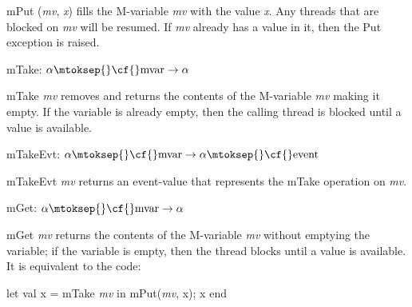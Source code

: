 \begin{descr}
\begin{speccomment}
\item {\cf \small m\-Put (\mbox{\cf \small \textit{mv}}, \mbox{\cf \small \textit{x}})           } 
fills the M-variable \mbox{\cf \small \textit{mv}} with the value \mbox{\cf \small \textit{x}}. 	  Any threads that are blocked on \mbox{\cf \small \textit{mv}} will be resumed. 	  If \mbox{\cf \small \textit{mv}} already has a value in it, then the {\cf \small Put} 	  exception is raised.     \end{speccomment}
\item {}{} {\cf mTake: \(\alpha\mtoksep{}\mbox{\cf{}mvar}\rightarrow \alpha\)}\label{val-SYNC_VAR.mTake}


\begin{speccomment}
\item {\cf \small m\-Take \mbox{\cf \small \textit{mv}}         } 
removes and returns the contents of the M-variable \mbox{\cf \small \textit{mv}} 	making it empty. 	If the variable is already empty, then the calling thread 	is blocked until a value is available.     \end{speccomment}
\item {}{} {\cf mTakeEvt: \(\alpha\mtoksep{}\mbox{\cf{}mvar}\rightarrow \alpha\mtoksep{}\mbox{\cf{}event}\)}\label{val-SYNC_VAR.mTakeEvt}


\begin{speccomment}
\item {\cf \small m\-Take\-Evt \mbox{\cf \small \textit{mv}}           } 
returns an event-value that represents the {\cf \small m\-Take} 	  operation on \mbox{\cf \small \textit{mv}}.     \end{speccomment}
\item {}{} {\cf mGet: \(\alpha\mtoksep{}\mbox{\cf{}mvar}\rightarrow \alpha\)}\label{val-SYNC_VAR.mGet}


\begin{speccomment}
\item {\cf \small m\-Get \mbox{\cf \small \textit{mv}}           } 
returns the contents of the M-variable \mbox{\cf \small \textit{mv}} without emptying 	  the variable; if the variable is empty, then the thread blocks until 	  a value is available. 	  It is equivalent to the code: 	  
\begin{code}
let val x = mTake \mbox{\cf \small \textit{mv}} in mPut(\mbox{\cf \small \textit{mv}}, x); x end
	  

\end{code}
\end{speccomment}
\end{descr}
